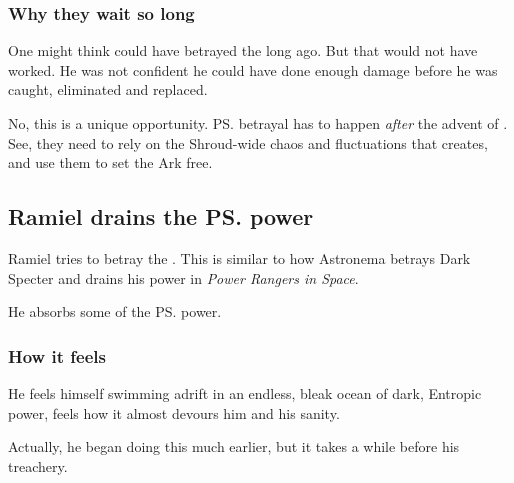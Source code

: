 \subsubsection{Why they wait so long}
One might think \Azraid{} could have betrayed the \banes{} long ago. 
But that would not have worked. 
He was not confident he could have done enough damage before he was caught, eliminated and replaced. 

No, this is a unique opportunity. 
\ps{\Azraid} betrayal has to happen \emph{after} the advent of \Lithrim. 
See, they need to rely on the Shroud-wide chaos and fluctuations that \Lithrim{} creates, and use them to set the Ark free. 









\subsection{Ramiel drains the \ps{\Voidbringer}{} power}
Ramiel tries to betray the \Voidbringer. 
This is similar to how Astronema betrays Dark Specter and drains his power in \emph{Power Rangers in Space}. 

He absorbs some of the \ps{\Voidbringer}{} power. 





\subsubsection{How it feels}
He feels himself swimming adrift in an endless, bleak ocean of dark, Entropic power, feels how it almost devours him and his sanity.


Actually, he began doing this much earlier, but it takes a while before \Daggerrain{}  his treachery. 





